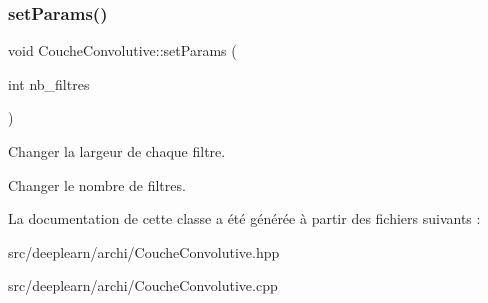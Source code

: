 \subsubsection{\texorpdfstring{set\+Params()}{setParams()}}
{\footnotesize\ttfamily void Couche\+Convolutive\+::set\+Params (\begin{DoxyParamCaption}\item[{int}]{nb\+\_\+filtres }\end{DoxyParamCaption})}



Changer la largeur de chaque filtre. 

Changer le nombre de filtres. 

La documentation de cette classe a été générée à partir des fichiers suivants \+:\begin{DoxyCompactItemize}
\item 
src/deeplearn/archi/Couche\+Convolutive.\+hpp\item 
src/deeplearn/archi/Couche\+Convolutive.\+cpp\end{DoxyCompactItemize}
